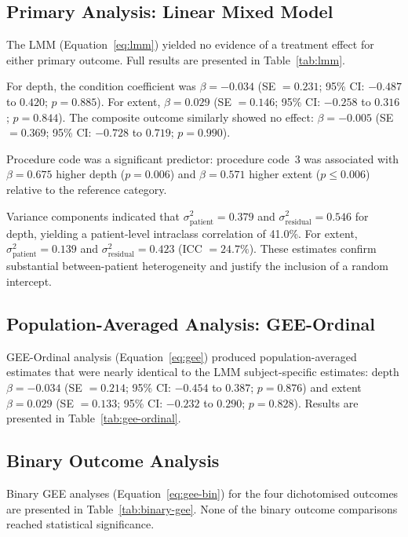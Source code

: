 \subsection{Primary Analysis: Linear Mixed Model}

The LMM (Equation~\ref{eq:lmm}) yielded no evidence of a treatment effect for either primary outcome. Full results are presented in Table~\ref{tab:lmm}.



For depth, the condition coefficient was $\beta = -0.034$ (SE $= 0.231$; 95\% CI: $-0.487$ to $0.420$; $p = 0.885$). For extent, $\beta = 0.029$ (SE $= 0.146$; 95\% CI: $-0.258$ to $0.316$; $p = 0.844$). The composite outcome similarly showed no effect: $\beta = -0.005$ (SE $= 0.369$; 95\% CI: $-0.728$ to $0.719$; $p = 0.990$).

Procedure code was a significant predictor: procedure code~3 was associated with $\beta = 0.675$ higher depth ($p = 0.006$) and $\beta = 0.571$ higher extent ($p \leq 0.006$) relative to the reference category.

Variance components indicated that $\sigma^2_{\text{patient}} = 0.379$ and $\sigma^2_{\text{residual}} = 0.546$ for depth, yielding a patient-level intraclass correlation of 41.0\%. For extent, $\sigma^2_{\text{patient}} = 0.139$ and $\sigma^2_{\text{residual}} = 0.423$ (ICC $= 24.7\%$). These estimates confirm substantial between-patient heterogeneity and justify the inclusion of a random intercept.

\subsection{Population-Averaged Analysis: GEE-Ordinal}

GEE-Ordinal analysis (Equation~\ref{eq:gee}) produced population-averaged estimates that were nearly identical to the LMM subject-specific estimates: depth $\beta = -0.034$ (SE $= 0.214$; 95\% CI: $-0.454$ to $0.387$; $p = 0.876$) and extent $\beta = 0.029$ (SE $= 0.133$; 95\% CI: $-0.232$ to $0.290$; $p = 0.828$). Results are presented in Table~\ref{tab:gee-ordinal}.



\subsection{Binary Outcome Analysis}

Binary GEE analyses (Equation~\ref{eq:gee-bin}) for the four dichotomised outcomes are presented in Table~\ref{tab:binary-gee}. None of the binary outcome comparisons reached statistical significance.

